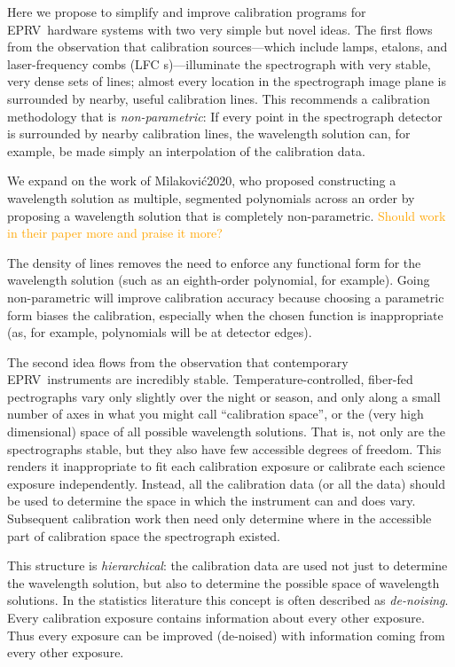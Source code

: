 \documentclass[12pt, letterpaper]{article}
\newcommand{\lz}[1]{\textcolor{orange}{#1}}
\newcommand{\acronym}[1]{{\small{#1}}}
\newcommand{\eprv}{\acronym{EPRV}}
\newcommand{\lfc}{\acronym{LFC}}
\begin{document}
Here we propose to simplify and improve calibration programs for
\eprv\ hardware systems with two very simple but novel ideas.
The first flows from the observation that calibration sources---which
include lamps, etalons, and laser-frequency combs (\lfc
s)---illuminate the spectrograph with very stable, very dense sets of lines; almost every
location in the spectrograph image plane is surrounded by nearby,
useful calibration lines.
This recommends a calibration methodology that is
\emph{non-parametric}:
If every point in the spectrograph detector is surrounded by nearby
calibration lines, the wavelength solution can, for example,  be made simply an interpolation of the calibration data.

We expand on the work of Milakovi\'{c}2020, who proposed constructing a wavelength solution as multiple, segmented polynomials across an order by proposing a wavelength solution that is completely non-parametric.
\lz{Should work in their paper more and praise it more?}

The density of lines removes the need to enforce any functional form for the wavelength solution (such as an eighth-order polynomial, for example).
Going non-parametric will improve calibration accuracy because
choosing a parametric form biases the calibration, especially when the chosen function is inappropriate (as, for example, polynomials will be at detector edges).

The second idea flows from the observation that contemporary
\eprv\ instruments are incredibly stable.
Temperature-controlled, fiber-fed pectrographs vary only slightly over
the night or season, and only along a small number of axes in what you
might call ``calibration space'', or the (very high dimensional) space
of all possible wavelength solutions.
That is, not only are the spectrographs stable, but they also have few accessible degrees of freedom.
This renders it inappropriate to fit each calibration exposure or calibrate
each science exposure independently.
Instead, all the calibration data (or all the data) should be used to
determine the space in which the instrument can and does vary.  Subsequent calibration work then need only determine where in the accessible part of calibration space the spectrograph existed.

This structure is \emph{hierarchical}: the calibration data are used
not just to determine the wavelength solution, but also to determine
the possible space of wavelength solutions.
In the statistics literature this concept is often described as
\emph{de-noising}.  
Every calibration exposure contains information about every other
exposure.  Thus every exposure can be improved (de-noised) with information coming from every other exposure.
\end{document}
